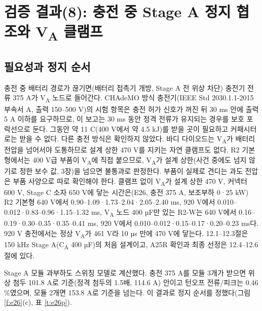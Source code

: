 \chapter{검증 결과(8): 충전 중 Stage A 정지 협조와 V\textsubscript{A} 클램프}

\section{필요성과 정지 순서}

충전 중 배터리 경로가 끊기면(배터리 접촉기 개방, Stage A 전 위상 차단) 충전기 전류 375 A가 V\textsubscript{A} 노드로 들어간다. CHAdeMO 방식 충전기(IEEE Std 2030.1.1-2015 부속서 A, 출력 150–500 V)의 시험 항목은 충전 허가 신호가 꺼진 뒤 30 ms 안에 출력 5 A 이하를 요구하므로\cite{b16}, 이 보고는 30 ms 동안 정격 전류가 유지되는 경우를 보호 포락선으로 둔다. 그동안 약 11 C(400 V에서 약 4.5 kJ)를 받을 곳이 필요하고 커패시터로는 받을 수 없다. 다른 충전 방식은 확인하지 않았다. 바디 다이오드는 V\textsubscript{A}가 배터리 전압을 넘어서야 도통하므로 설계 상한 470 V를 지키는 자연 클램프도 없다. R2 기본형에서는 400 V급 부품이 V\textsubscript{A}에 직접 붙으므로, V\textsubscript{A}가 설계 상한(사건 중에도 넘지 않기로 정한 보수 값, 3장)을 넘으면 불통과로 판정한다. 부품이 실제로 견디는 과도 전압은 부품 사양으로 따로 확인해야 한다. 클램프 없이 V\textsubscript{A}가 설계 상한 470 V, 커넥터 600 V, Stage C 소자 650 V에 닿는 시간은(E26, 충전 375 A, 보조부하 0·25 kW) R2 기본형 640 V에서 0.90–1.09·1.73–2.04·2.05–2.40 ms, 920 V에서 0.010–0.012·0.83–0.96·1.15–1.32 ms, V\textsubscript{A} 노드 400 µF만 있는 R2-W는 640 V에서 0.16–0.19·0.30–0.35·0.35–0.41 ms, 920 V에서 0.010–0.012·0.15–0.17·0.20–0.23 ms다. 920 V 충전에서는 정상 V\textsubscript{A}가 461 V라 10 µs 만에 470 V에 닿는다. 12.1–12.3절은 150 kHz Stage A(C\textsubscript{A} 400 µF)의 처음 설계이고, A25R 확인과 최종 선정은 12.4–12.6절에 있다.


Stage A 모듈 과부하도 스위칭 모델로 계산했다. 충전 375 A를 모듈 3개가 받으면 위상 첨두 101.8 A로 기준(정격 첨두의 1.5배, 114.6 A) 안이고 턴오프 전류/피크는 0.46 \%였으며, 모듈 2개면 153.8 A로 기준을 넘는다. 이 결과로 정지 순서를 정했다(그림 \ref{f:e26}(c), 표 \ref{t:e26p}).

